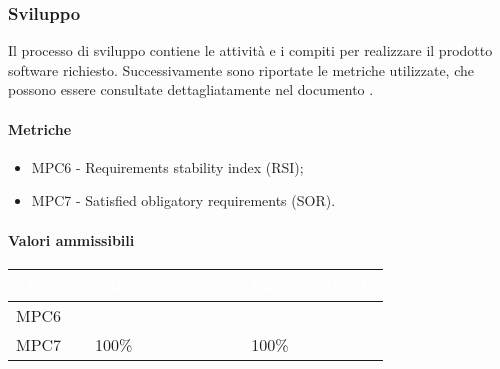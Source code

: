 \subsubsection{Sviluppo}
Il processo di sviluppo contiene le attività e i compiti per realizzare il prodotto software richiesto. Successivamente sono riportate le metriche utilizzate, che possono essere consultate dettagliatamente nel documento .

\paragraph{Metriche}
\begin{itemize}
	\item MPC6 - Requirements stability index (RSI);
	\item MPC7 - Satisfied obligatory requirements (SOR).
\end{itemize}


\paragraph{Valori ammissibili}
{
\renewcommand{\arraystretch}{1.5}
\centering
\begin{longtable}{C{2.5cm} C{7cm} C{4cm}}
\textcolor{white}{\textbf{Metrica}}&
\textcolor{white}{\textbf{Valori accettabile}}&
\textcolor{white}{\textbf{Valore ottimale}}\\	
\endhead

MPC6 &   &  \\
MPC7 & 100\% & 100\%
\end{longtable}
}

